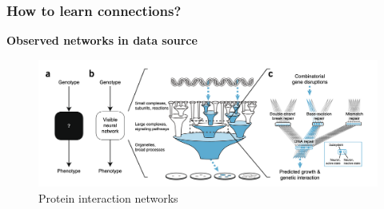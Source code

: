 \documentclass{beamer}
\begin{document}
  
  \begin{frame}
    \frametitle{How to learn connections?}
    \textbf{Observed networks in data source}\\
    \begin{figure}
      \centering
      \includegraphics[width=\textwidth]{images/vnn.png}
      \caption{Protein interaction networks}
    \end{figure}
  \end{frame}
  
\end{document}
